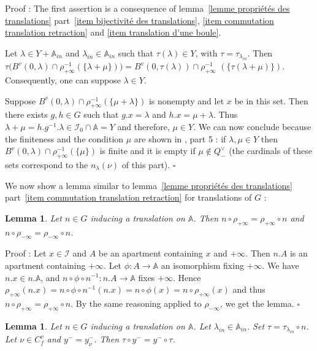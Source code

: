 \documentclass[12pt]{article}
\theoremstyle{plain}
\newtheorem{lemme}[thm]{Lemma}
\theoremstyle{definition}
\newcommand{\A}{\mathbb{A}}
\newcommand{\I}{\mathcal{I}}
\begin{document}
Proof : The first assertion is a consequence of lemma~\ref{lemme propriétés des translations} part~\ref{item bijectivité des translations}, \ref{item commutation translation retraction} and \ref{item translation d'une boule}.

Let $\lambda\in Y+\A_{in}$ and $\lambda_{in}\in \A_{in}$ such that $\tau(\lambda)\in Y$, 
with $\tau=\tau_{\lambda_{in}}$. Then 
$\tau\big(B^v(0,\lambda)\cap\rho_{+\infty}^{-1}(\{\lambda+\mu\})\big)=B^v(0,\tau(\lambda))\cap\rho_{+\infty}^{-1}$ $(\{\tau(\lambda+\mu )\})$. Consequently, one can suppose $\lambda\in Y$. 

Suppose $B^v(0,\lambda)\cap \rho_{+\infty}^{-1}(\{\mu+\lambda\})$ is nonempty and let $x$ be in this set. Then there exists $g,h\in G$ such that $g.x=\lambda$ and $h.x=\mu+\lambda$. Thus $\lambda+\mu=h.g^{-1}.\lambda\in \I_0\cap \A=Y$ and therefore, $\mu\in Y$. We can now conclude because the finiteness and the condition $\mu$ are shown in \cite{gaussent2014spherical}, part 5 : if $\lambda, \mu\in Y$ then $B^v(0,\lambda)\cap \rho_{+\infty}^{-1}(\{\mu\})$ is finite and it is empty if $\mu\notin Q^\vee_-$ (the cardinals of these sets correspond to the $n_\lambda(\nu)$ of this part).
$\square$

\vspace{3mm}

We now show a lemma similar to lemma~\ref{lemme propriétés des translations} part~\ref{item commutation translation retraction} for translations of $G$ : 

\begin{lemme}\label{lemme commutation des translations et rétractions}
Let $n\in G$ inducing a translation on $\A$. Then $n\circ\rho_{+\infty}=\rho_{+\infty}\circ n$ and $n\circ \rho_{-\infty}=\rho_{-\infty}\circ n$.
\end{lemme}

Proof : 
Let $x\in\mathcal{I}$ and $A$ be an apartment containing $x$ and $+\infty$. Then $n.A$ is an apartment containing $+\infty$. Let $\phi:A\rightarrow \mathbb{A}$ an isomorphism fixing $+\infty$. We have $n.x\in n.\mathbb{A}$, and $n\circ\phi\circ n^{-1}:n.A\rightarrow \mathbb{A}$ fixes $+\infty$. Hence $\rho_{+\infty}(n.x)=n\circ\phi\circ n^{-1}(n.x)=n\circ\phi(x)=n\circ\rho_{+\infty}(x)$ and thus $n\circ \rho_{+\infty}=\rho_{+\infty}\circ n$. By the same reasoning applied to $\rho_{-\infty}$, we get the lemma. $\square$
 
 
 

\begin{lemme}\label{lemme y- des translatés}
Let $n\in G$ inducing a translation on $\mathbb{A}$. Let $\lambda_{in}\in \A_{in}$. Set $\tau=\tau_{\lambda_{in}}\circ n$. Let $\nu\in C_f^v$ and $y^-=y_\nu^-$. Then $\tau\circ y^-=y^-\circ \tau$.
\end{lemme}
\end{document}
